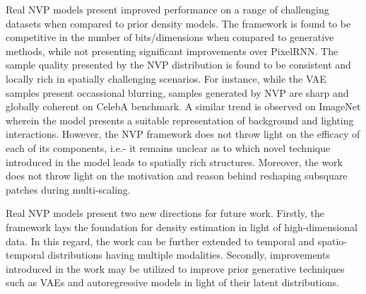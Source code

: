 \documentclass[11pt,letterpaper]{article}
\begin{document}
Real NVP models present improved performance on a range of challenging datasets when compared to prior density models. The framework is found to be competitive in the number of bits/dimensions when compared to generative methods, while not presenting significant improvements over PixelRNN. The sample quality presented by the NVP distribution is found to be consistent and locally rich in spatially challenging scenarios. For instance, while the VAE samples present occassional blurring, samples generated by NVP are sharp and globally coherent on CelebA benchmark. A similar trend is observed on ImageNet wherein the model presents a suitable representation of background and lighting interactions. However, the NVP framework does not throw light on the efficacy of each of its components, i.e.- it remains unclear as to which novel technique introduced in the model leads to spatially rich structures. Moreover, the work does not throw light on the motivation and reason behind reshaping subsquare patches during multi-scaling.

Real NVP models present two new directions for future work. Firstly, the framework lays the foundation for density estimation in light of high-dimensional data. In this regard, the work can be further extended to temporal and spatio-temporal distributions having multiple modalities. Secondly, improvements introduced in the work may be utilized to improve prior generative techniques such as VAEs and autoregressive models in light of their latent distributions. 
\end{document}
